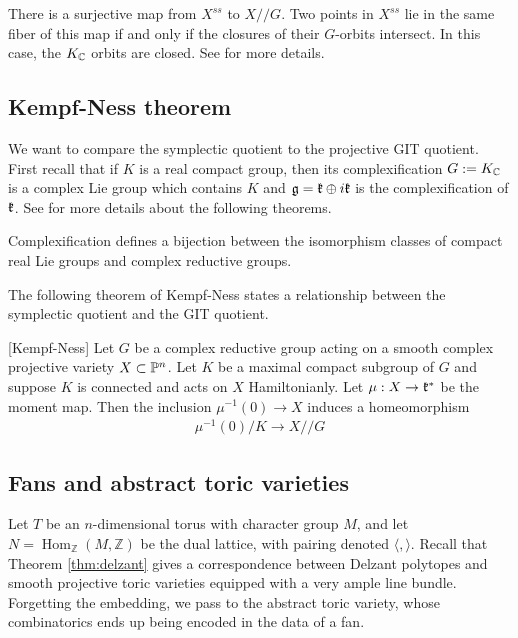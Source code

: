 \begin{remark}
    There is a surjective map from $X^{ss}$ to $X//G$. Two points in $X^{ss}$ lie in the same fiber of this map if and only if the closures of their 
    $G$-orbits intersect. In this case, the $K_\C$ orbits are closed. See \cite{proudfoot} for more details.
\end{remark}
\subsection{Kempf-Ness theorem}
We want to compare the symplectic quotient to the projective GIT quotient.  First recall
that if $K$ is a real compact group, then its complexification $G := K_\C$ is a 
complex Lie group which contains $K$ and $\mf g = \mf k \oplus i\mf k$ is the complexification
 of $\mf k$. See \cite{hoskins} for more details about the following theorems.

\begin{theorem}
    Complexification defines a bijection between the isomorphism
    classes of compact real Lie groups and complex reductive groups.
\end{theorem}
The following theorem of Kempf-Ness states a relationship between the symplectic quotient and the GIT quotient.
\begin{theorem}{\label{thm:kempf-ness}}
    [Kempf-Ness] 
    Let $G$ be a complex reductive group acting on a smooth complex projective variety 
    $X\subset \P^n$. Let $K$ be a maximal compact subgroup of $G$ and suppose $K$ 
    is connected and acts on $X$ Hamiltonianly. Let $\mu:X\to\mf k^*$ be the moment map. 
    Then the inclusion $\mu^{-1}(0)\to X$ induces a homeomorphism \begin{align*}
        \mu^{-1}(0)/K \to X//G
    \end{align*}
\end{theorem}

\begin{remark}
\end{remark}

\subsection{Fans and abstract toric varieties}

Let \( T \) be an \( n \)-dimensional torus with character group \( M \),
 and let \( N = \operatorname{Hom}_{\mathbb{Z}}(M, \mathbb{Z}) \) be
  the dual lattice, with pairing denoted \( \langle , \rangle \). Recall that Theorem \ref{thm:delzant} gives a correspondence between Delzant polytopes 
and smooth projective toric varieties equipped with a very ample line bundle.
Forgetting the embedding, we pass to the abstract toric variety, whose combinatorics 
ends up being encoded in the data of a fan.

